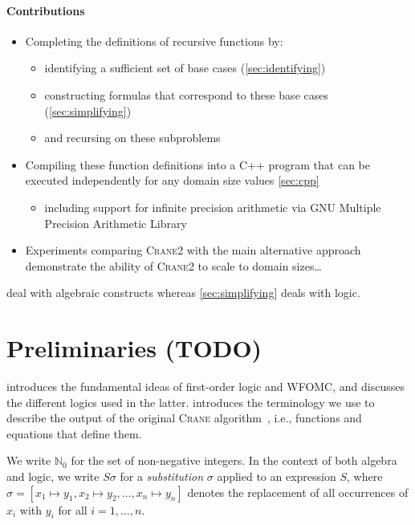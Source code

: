 \documentclass{article}
\theoremstyle{definition}
\newcommand{\Cranetwo}{\textsc{Crane2}}
\begin{document}

\paragraph{Contributions}
\begin{itemize}
  \item Completing the definitions of recursive functions by:
  \begin{itemize}
    \item identifying a sufficient set of base cases (\cref{sec:identifying})
    \item constructing formulas that correspond to these base cases
          (\cref{sec:simplifying})
    \item and recursing on these subproblems
  \end{itemize}
  \item Compiling these function definitions into a C++ program that can be
        executed independently for any domain size values \cref{sec:cpp}
        \begin{itemize}
          \item including support for infinite precision arithmetic via GNU
                Multiple Precision Arithmetic Library
        \end{itemize}
  \item Experiments comparing \Cranetwo{} with the main alternative approach
        demonstrate the ability of \Cranetwo{} to scale to domain sizes\dots
\end{itemize}

 deal with algebraic constructs whereas
\cref{sec:simplifying} deals with logic.

\section{Preliminaries (TODO)}

 introduces the fundamental ideas of first-order logic and
WFOMC, and discusses the different logics used in the latter.\@
{} introduces the terminology we use to describe the output of
the original \textsc{Crane} algorithm~\cite{DBLP:conf/kr/DilkasB23}, i.e.,
functions and equations that define them.

We write $\mathbb{N}_{0}$ for the set of non-negative integers. In the context
of both algebra and logic, we write $S\sigma$ for a \emph{substitution} $\sigma$
applied to an expression $S$, where
$\sigma = [x_{1} \mapsto y_{1}, x_{2} \mapsto y_{2}, \dots, x_{n} \mapsto y_{n}]$
denotes the replacement of all occurrences of $x_{i}$ with $y_{i}$ for all
$i = 1, \dots, n$.
\end{document}
